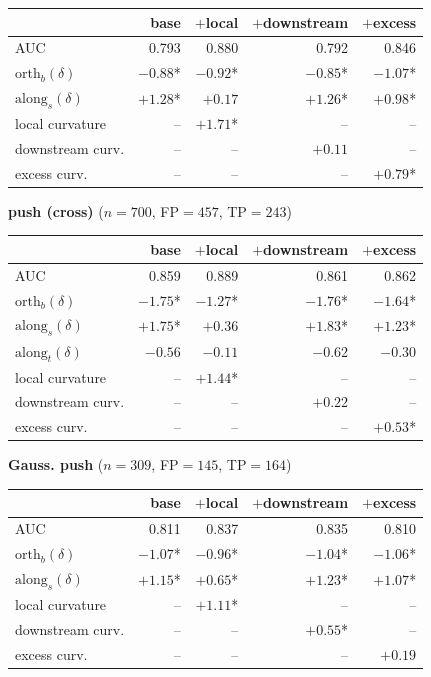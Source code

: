 \begin{table}[t]
\begin{tabular}{l r r r r}
\toprule
 & base & $+$local & $+$downstream & $+$excess \\
\midrule
AUC & 0.793 & 0.880 & 0.792 & 0.846 \\
$\mathrm{orth}_b(\delta)$ & $-0.88$* & $-0.92$* & $-0.85$* & $-1.07$* \\
$\mathrm{along}_s(\delta)$ & $+1.28$* & $+0.17$ & $+1.26$* & $+0.98$* \\
local curvature & -- & $+1.71$* & -- & -- \\
downstream curv. & -- & -- & $+0.11$ & -- \\
excess curv. & -- & -- & -- & $+0.79$* \\
\bottomrule
\end{tabular}

\medskip
\textbf{push (cross)} ($n=700$, FP$=457$, TP$=243$)

\begin{tabular}{l r r r r}
\toprule
 & base & $+$local & $+$downstream & $+$excess \\
\midrule
AUC & 0.859 & 0.889 & 0.861 & 0.862 \\
$\mathrm{orth}_b(\delta)$ & $-1.75$* & $-1.27$* & $-1.76$* & $-1.64$* \\
$\mathrm{along}_s(\delta)$ & $+1.75$* & $+0.36$ & $+1.83$* & $+1.23$* \\
$\mathrm{along}_t(\delta)$ & $-0.56$ & $-0.11$ & $-0.62$ & $-0.30$ \\
local curvature & -- & $+1.44$* & -- & -- \\
downstream curv. & -- & -- & $+0.22$ & -- \\
excess curv. & -- & -- & -- & $+0.53$* \\
\bottomrule
\end{tabular}

\medskip
\textbf{Gauss. push} ($n=309$, FP$=145$, TP$=164$)

\begin{tabular}{l r r r r}
\toprule
 & base & $+$local & $+$downstream & $+$excess \\
\midrule
AUC & 0.811 & 0.837 & 0.835 & 0.810 \\
$\mathrm{orth}_b(\delta)$ & $-1.07$* & $-0.96$* & $-1.04$* & $-1.06$* \\
$\mathrm{along}_s(\delta)$ & $+1.15$* & $+0.65$* & $+1.23$* & $+1.07$* \\
local curvature & -- & $+1.11$* & -- & -- \\
downstream curv. & -- & -- & $+0.55$* & -- \\
excess curv. & -- & -- & -- & $+0.19$ \\
\bottomrule
\end{tabular}

\end{table}
